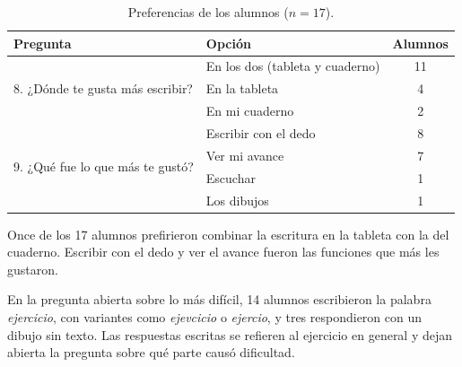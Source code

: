 \begin{table}[H]
\centering
\caption{Preferencias de los alumnos ($n=17$).}
\label{tab:preferencias-alumnos}
\renewcommand{\arraystretch}{1.3}
\begin{tabular}{|p{5.2cm}|p{5.2cm}|c|}
\hline
\textbf{Pregunta} & \textbf{Opción} & \textbf{Alumnos} \\ \hline
\multirow{3}{=}{8. ¿Dónde te gusta más escribir?} & En los dos (tableta y cuaderno) & 11 \\ \cline{2-3}
 & En la tableta & 4 \\ \cline{2-3}
 & En mi cuaderno & 2 \\ \hline
\multirow{4}{=}{9. ¿Qué fue lo que más te gustó?} & Escribir con el dedo & 8 \\ \cline{2-3}
 & Ver mi avance & 7 \\ \cline{2-3}
 & Escuchar & 1 \\ \cline{2-3}
 & Los dibujos & 1 \\ \hline
\end{tabular}
\end{table}

Once de los 17 alumnos prefirieron combinar la escritura en la tableta con la del cuaderno. Escribir con el dedo y ver el avance fueron las funciones que más les gustaron.

En la pregunta abierta sobre lo más difícil, 14 alumnos escribieron la palabra \textit{ejercicio}, con variantes como \textit{ejevcicio} o \textit{ejercio}, y tres respondieron con un dibujo sin texto. Las respuestas escritas se refieren al ejercicio en general y dejan abierta la pregunta sobre qué parte causó dificultad.

